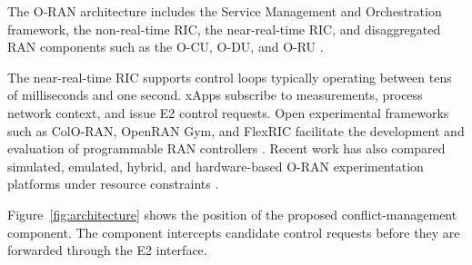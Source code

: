 \documentclass[pdflatex,sn-mathphys-num,iicol,oneside]{sn-jnl}
\begin{document}
The O-RAN architecture includes the Service Management and
Orchestration framework, the non-real-time RIC, the near-real-time
RIC, and disaggregated RAN components such as the O-CU, O-DU, and
O-RU \cite{polese2023oran}.

The near-real-time RIC supports control loops typically operating
between tens of milliseconds and one second. xApps subscribe to
measurements, process network context, and issue E2 control requests.
Open experimental frameworks such as ColO-RAN, OpenRAN Gym, and
FlexRIC facilitate the development and evaluation of programmable
RAN controllers
\cite{polese2022coloran,bonati2023openrangym,
schmidt2021flexric}. Recent work has also compared simulated,
emulated, hybrid, and hardware-based O-RAN experimentation platforms
under resource constraints \cite{navarro2026testbeds}.

Figure~\ref{fig:architecture} shows the position of the proposed
conflict-management component. The component intercepts candidate
control requests before they are forwarded through the E2 interface.
\end{document}
